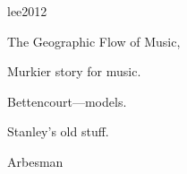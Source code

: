 lee2012

{The Geographic Flow of Music},

Murkier story for music.

  

  Bettencourt---models.

  Stanley's old stuff.

  

  Arbesman

  \cite{arbesman2009a}

